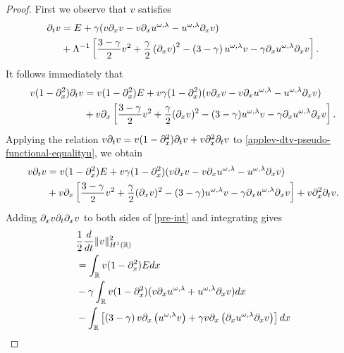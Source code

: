 \begin{proof} First we observe that $v$ satisfies 
%
%
\begin{equation*}
\begin{split}
\partial_t v & = E + \gamma(v \partial_x v - v \partial_x u^{\omega,\lambda} - 
u^{\omega,\lambda} \partial_x v) \\
& + \Lambda^{-1}  \left[ \frac{3-
\gamma}{2}v^2 + \frac{\gamma}{2}\left( \partial_x v \right)^2 - \left(
3 - \gamma \right)u^{\omega,\lambda} v -
\gamma \partial_x u^{\omega,\lambda} \partial_x v \right].
\end{split}
\end{equation*}
It follows immediately that
\begin{equation}
\label{applev-dtv-pseudo-functional-equalityu}
\begin{split}
v(1-\partial_x^2)\partial_t v &= v(1- \partial_x^2)E + v\gamma(1- \partial_x^2)(v\partial_x v 
- v\partial_x u^{\omega,\lambda} -
u^{\omega,\lambda} \partial_x v)
\\
&+ v\partial_x \left[ \frac{3-\gamma}{2}v^2 + \frac{\gamma}{2}(\partial_x v)^2 -
(3-\gamma)u^{\omega,\lambda} v - \gamma \partial_x u^{\omega,\lambda} \partial_x v \right].
\end{split}
\end{equation}
Applying the relation $v\partial_t v = v(1-\partial_x^2) \partial_t v + v\partial_x^2 \partial_t v$ to
\eqref{applev-dtv-pseudo-functional-equalityu}, we obtain
\begin{equation}
\label{pre-int}
\begin{split}
v \partial_t v &= v(1- \partial_x^2)E + v\gamma(1- \partial_x^2)(v\partial_x v - v\partial_x u^{\omega,\lambda} -
u^{\omega,\lambda} \partial_x v)
\\
&+ v\partial_x \left[ \frac{3-\gamma}{2}v^2 + \frac{\gamma}{2}(\partial_x v)^2 -
(3-\gamma)u^{\omega,\lambda} v - \gamma \partial_x u^{\omega,\lambda} \partial_x v
\right] + v\partial_x^2 \partial_t v.
\end{split}
\end{equation}
Adding $\partial_x v \partial_t \partial_x v$ to both sides of \eqref{pre-int} and 
integrating gives
\begin{equation}
\label{appleenergy-estu}
\begin{split}
&\frac{1}{2} \frac{d}{dt} \|v\|_{H^1(\rr)}^2  
\\
& =  \int_{\rr} v(1-\p_x^2)E dx
\\
& - \gamma \int_{\rr}  v(1-\p_x^2)(v\p_x u^{\omega,\lambda} + u^{\omega,\lambda} \p_x v) dx
\\
&- \int_{\rr}\left[ \left( 3-\gamma \right)v \p_x\left( u^{\omega,\lambda}v \right) + \gamma v
\p_x \left( \p_x u^{\omega,\lambda} \p_x v \right)\right]dx

\end{split}
\end{equation}
\end{proof}
